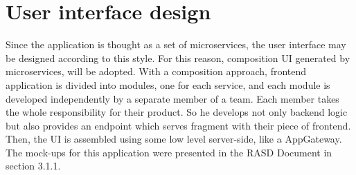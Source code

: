 \section{User interface design}
Since the application is thought as a set of  microservices, the user interface may be designed according to this style. 
For this reason, composition UI generated by microservices, will be adopted. 
With a composition approach, frontend application is divided into modules, one for each service, and each module is developed independently by a separate member of a team. 
Each member takes the whole responsibility for their product. 
So he develops not only backend logic but also provides an endpoint which serves fragment with their piece of frontend. 
Then, the UI is assembled using some low level server-side, like a AppGateway. 
The mock-ups for this application were presented in the RASD Document in section 3.1.1. 